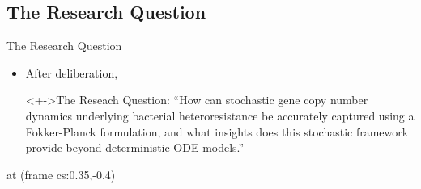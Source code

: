\documentclass[aspectratio=169, onlytextwidth,  notheorems, sOuRcEs, fleqn, leqno, ]{RUCPresentation}
\newcounter{reaction}
\begin{document}
\subsection{The Research Question}
\begin{frame}[t]{The Research Question}



    \begin{itemize}[<+->]
        \item After  deliberation,
            \begin{block}<+->{The Reseach Question:}
                ``How can stochastic gene copy number dynamics underlying bacterial
                heteroresistance be accurately captured using a Fokker-Planck formulation,
                and what insights does this stochastic framework provide beyond deterministic ODE models.''
            \end{block}
    \end{itemize}


      at (frame cs:0.35,-0.4) {%
        }
\end{frame}
\end{document}
